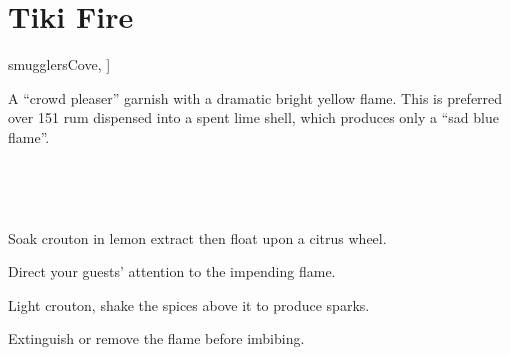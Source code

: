 \section{Tiki Fire}\label{TikiFire}

\begin{recipestats}[
        servings=1,
        preptime=5~\minute,
        original=\citeauthor{smugglersCove}~\cite[p.~245]{smugglersCove},
    ]
\end{recipestats}

\begin{recipeabstract}
    A ``crowd pleaser'' garnish with a dramatic bright yellow flame.
    This is preferred over 151 rum dispensed into a spent lime shell, which produces
    only a ``sad blue flame''.
\end{recipeabstract}

\begin{ingredientcolumns}
    \begin{ingredientblock}
        \\
    \end{ingredientblock}

    \begin{ingredientblock}
        \\
    \end{ingredientblock}
\end{ingredientcolumns}

\begin{preparation}
\item Soak crouton in lemon extract then float upon a citrus wheel.
\item Direct your guests' attention to the impending flame.
\item Light crouton, shake the spices above it to produce sparks.
\item Extinguish or remove the flame before imbibing.
\end{preparation}

\recipeend%
